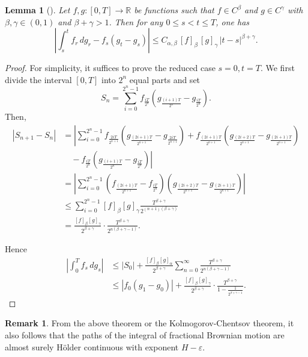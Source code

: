 \documentclass[preprint,12pt]{elsarticle}
\newtheorem{lemma}[theorem]{Lemma}
\theoremstyle{definition}  %
\newtheorem{remark}{Remark}
\theoremstyle{plain}  %
\begin{document}
	\begin{lemma}[\cite{Young1936}] \label{young2}
Let $f,g:[0,T]\to \mathbb{R}$ be functions such that $f \in C^{\beta}$ 
and $g \in C^{\gamma}$ with $\beta,\gamma \in (0,1)$ and $\beta+\gamma>1$. 
Then  for any $0\leq s<t\leq T$, one has
\begin{equation}
	\left|\int_s^t f_r \, dg_r - f_s (g_t-g_s)\right|
   \leq C_{\alpha,\beta}\, [f]_{\beta}\,[g]_{\gamma}\, |t-s|^{\beta+\gamma}.\label{youngint}
\end{equation}
\end{lemma}

\begin{proof}
	For simplicity, it suffices to prove the reduced case $s=0, t=T$. 
We first divide the interval $[0,T]$ into $2^n$ equal parts and set  
\[
   S_n=\sum_{i=0}^{2^n-1} f_{\tfrac{iT}{2^n}}\left(g_{\tfrac{(i+1)T}{2^n}}-g_{\tfrac{iT}{2^n}}\right).
\]
Then,\begin{align*}
   |S_{n+1}-S_n|
   &=\left|\sum_{i=0}^{2^n-1} f_{\tfrac{2iT}{2^{n+1}}}\left(g_{\tfrac{(2i+1)T}{2^{n+1}}}-g_{\tfrac{2iT}{2^{n+1}}}\right)
     + f_{\tfrac{(2i+1)T}{2^{n+1}}}\left(g_{\tfrac{(2i+2)T}{2^{n+1}}}-g_{\tfrac{(2i+1)T}{2^{n+1}}}\right) \right.\\
   &\quad -\left. f_{\tfrac{iT}{2^n}}\left(g_{\tfrac{(i+1)T}{2^n}}-g_{\tfrac{iT}{2^n}}\right)\right| \\
   &=\left|\sum_{i=0}^{2^n-1} \left(f_{\tfrac{(2i+1)T}{2^{n+1}}}-f_{\tfrac{iT}{2^n}}\right)\left(g_{\tfrac{(2i+2)T}{2^{n+1}}}-g_{\tfrac{(2i+1)T}{2^{n+1}}}\right)\right| \\
   &\leq \sum_{i=0}^{2^n-1}[f]_\beta [g]_\gamma \frac{T^{\beta+\gamma}}{2^{(n+1)(\beta+\gamma)}} \\
   &= \frac{[f]_\beta [g]_\gamma}{2^{\beta+\gamma}}\cdot \frac{T^{\beta+\gamma}}{2^{n(\beta+\gamma-1)}}.
\end{align*}

Hence
\begin{align*}
     \left|\int_0^T f_s\,dg_s\right|
  & \leq |S_0| + \frac{[f]_\beta [g]_\alpha}{2^{\beta+\gamma}}\sum_{n=0}^\infty \frac{T^{\beta+\gamma}}{2^{n(\beta+\gamma-1)}}\\
   &\leq |f_0(g_1-g_0)| + \frac{[f]_\beta [g]_\gamma}{2^{\beta+\gamma}}\cdot \frac{T^{\beta+\gamma}}{1-\tfrac{1}{2^{\beta+\gamma-1}}}.
\end{align*}


\end{proof}
    \begin{remark}
        From the above theorem or the Kolmogorov-Chentsov theorem, it also follows that the paths of the integral of fractional Brownian motion are almost surely H\"older continuous with exponent $H - \varepsilon$.
    \end{remark}
\end{document}
